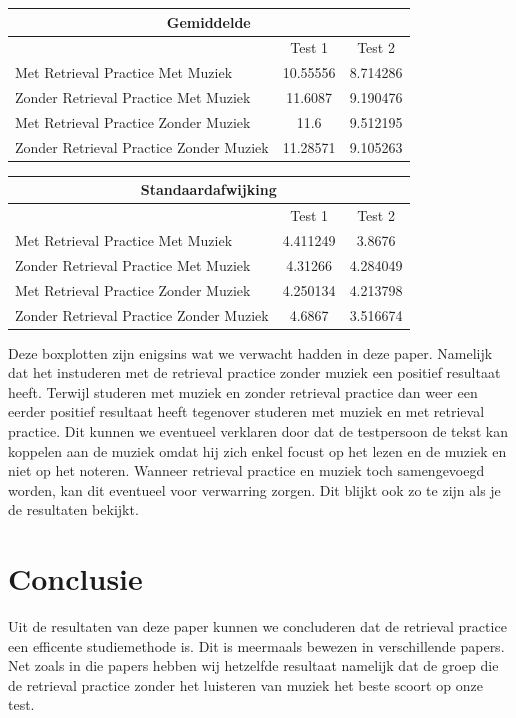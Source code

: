 \documentclass{hogent-article}
\begin{document}
	\begin{tabular}{ |p{10em}|c|c| }
	\hline
		\multicolumn{3}{|c|}{Gemiddelde} \\
	\hline
		& Test 1 & Test 2 \\
	\hline
		Met Retrieval Practice Met Muziek  & 10.55556 & 8.714286 \\
	\hline
		Zonder Retrieval Practice Met Muziek & 11.6087 & 9.190476 \\
	\hline
		Met Retrieval Practice Zonder Muziek & 11.6 & 9.512195 \\
	\hline
		Zonder Retrieval Practice Zonder Muziek & 11.28571 & 9.105263 \\
	\hline
	\end{tabular}

	\begin{tabular}{ |p{10em} |c|c| }
	\hline
		\multicolumn{3}{|c|}{Standaardafwijking} \\
	\hline
		& Test 1 & Test 2 \\
	\hline
		Met Retrieval Practice Met Muziek  & 4.411249 & 3.8676\\
	\hline
		Zonder Retrieval Practice Met Muziek & 4.31266 & 4.284049 \\
	\hline
		Met Retrieval Practice Zonder Muziek & 4.250134  & 4.213798\\
	\hline
		Zonder Retrieval Practice Zonder Muziek & 4.6867 & 3.516674 \\
	\hline
	\end{tabular}
	
	Deze boxplotten zijn enigsins wat we verwacht hadden in deze paper. Namelijk dat het instuderen met de retrieval practice zonder muziek een positief resultaat heeft. Terwijl studeren met muziek en zonder retrieval practice dan weer een eerder positief resultaat heeft tegenover studeren met muziek en met retrieval practice. Dit kunnen we eventueel verklaren door dat de testpersoon de tekst kan koppelen aan de muziek omdat hij zich enkel focust op het lezen en de muziek en niet op het noteren. Wanneer retrieval practice en muziek toch samengevoegd worden, kan dit eventueel voor verwarring zorgen. Dit blijkt ook zo te zijn als je de resultaten bekijkt. 
	
	\section{Conclusie}
	Uit de resultaten van deze paper kunnen we concluderen dat de retrieval practice een efficente studiemethode is. Dit is meermaals bewezen in verschillende papers. Net zoals in die papers hebben wij hetzelfde resultaat namelijk dat de groep die de retrieval practice zonder het luisteren van muziek het beste scoort op onze test.
	
\end{document}
